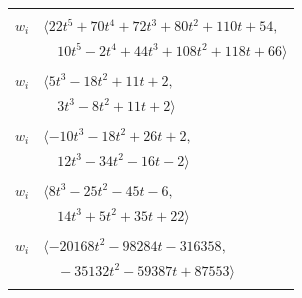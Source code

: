 \documentclass[11pt]{article}
\begin{document}
\begin{longtable}{@{}ll@{}}
\addlinespace[2pt]
\multicolumn{2}{@{}p{0.97\textwidth}@{}}{$i=26$, $D_i=1$, $\varphi_i=1$, $\rho_{ij}$: $5{:}1, \allowbreak 8{:}2, \allowbreak 10{:}3, \allowbreak 11{:}3, \allowbreak 15{:}3, \allowbreak 19{:}1, \allowbreak 22{:}3, \allowbreak 25{:}3, \allowbreak 31{:}1, \allowbreak 34{:}1, \allowbreak 37{:}1, \allowbreak 40{:}2, \allowbreak 41{:}1, \allowbreak 45{:}3$}\\
$w_i$ & $\langle 22t^{5}+70t^{4}+72t^{3}+80t^{2}+110t+54,$\\
 & $\quad 10t^{5}-2t^{4}+44t^{3}+108t^{2}+118t+66\rangle$\\
\addlinespace[2pt]
\multicolumn{2}{@{}p{0.97\textwidth}@{}}{$i=27$, $D_i=1$, $\varphi_i=\tau(\Pi_{35})$, $\rho_{ij}$: $16{:}3, \allowbreak 19{:}2, \allowbreak 21{:}3, \allowbreak 28{:}2, \allowbreak 29{:}2, \allowbreak 30{:}3, \allowbreak 31{:}1, \allowbreak 38{:}1, \allowbreak 40{:}3, \allowbreak 46{:}2$}\\
$w_i$ & $\langle 5t^{3}-18t^{2}+11t+2,$\\
 & $\quad 3t^{3}-8t^{2}+11t+2\rangle$\\
\addlinespace[2pt]
\multicolumn{2}{@{}p{0.97\textwidth}@{}}{$i=28$, $D_i=1$, $\varphi_i=1$, $\rho_{ij}$: $5{:}2, \allowbreak 9{:}2, \allowbreak 11{:}2, \allowbreak 12{:}2, \allowbreak 27{:}2, \allowbreak 30{:}2, \allowbreak 33{:}2$}\\
$w_i$ & $\langle -10t^{3}-18t^{2}+26t+2,$\\
 & $\quad 12t^{3}-34t^{2}-16t-2\rangle$\\
\addlinespace[2pt]
\multicolumn{2}{@{}p{0.97\textwidth}@{}}{$i=29$, $D_i=1$, $\varphi_i=1$, $\rho_{ij}$: $5{:}2, \allowbreak 11{:}3, \allowbreak 15{:}2, \allowbreak 27{:}2, \allowbreak 30{:}2, \allowbreak 33{:}1, \allowbreak 34{:}1, \allowbreak 38{:}3, \allowbreak 39{:}3, \allowbreak 46{:}3$}\\
$w_i$ & $\langle 8t^{3}-25t^{2}-45t-6,$\\
 & $\quad 14t^{3}+5t^{2}+35t+22\rangle$\\
\addlinespace[2pt]
\multicolumn{2}{@{}p{0.97\textwidth}@{}}{$i=30$, $D_i=77367$, $\varphi_i=\tau(\Pi_{38})$, $\rho_{ij}$: $3{:}2, \allowbreak 8{:}1, \allowbreak 9{:}3, \allowbreak 19{:}3, \allowbreak 27{:}1, \allowbreak 28{:}2, \allowbreak 29{:}2, \allowbreak 44{:}1$}\\
$w_i$ & $\langle -20168t^{2}-98284t-316358,$\\
 & $\quad -35132t^{2}-59387t+87553\rangle$\\
\addlinespace[2pt]
\multicolumn{2}{@{}p{0.97\textwidth}@{}}{$i=31$, $D_i=74$, $\varphi_i=\tau(\Pi_{41})$, $\rho_{ij}$: $1{:}1, \allowbreak 5{:}1, \allowbreak 12{:}3, \allowbreak 13{:}1, \allowbreak 18{:}1, \allowbreak 19{:}2, \allowbreak 23{:}3, \allowbreak 26{:}3, \allowbreak 27{:}3, \allowbreak 37{:}3, \allowbreak 45{:}2, \allowbreak 46{:}1$}\\

\end{longtable}
\end{document}
